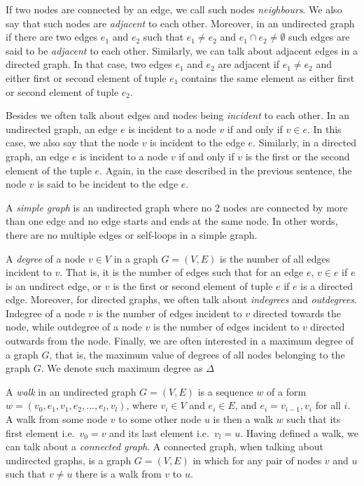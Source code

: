 If two nodes are connected by an edge, we call such nodes \emph{neighbours}. We
also say that such nodes are \emph{adjacent} to each other. Moreover, in an undirected graph
if there are two edges $e_1$ and $e_2$ such that $e_1 \neq e_2$ and $e_1 \cap e_2 \neq \emptyset$
such edges are said to be \emph{adjacent} to each other. Similarly, we can talk about adjacent 
edges in a directed graph. In that case, two edges $e_1$ and $e_2$ are adjacent if
$e_1 \neq e_2$ and either first or second element of tuple $e_1$ contains the same
element as either first or second element of tuple $e_2$.

Besides we often talk about edges and nodes being \emph{incident} to each other.
In an undirected graph, an edge $e$ is incident to a node $v$ if and only if $v \in e$. In this
case, we also say that the node $v$ is incident to the edge $e$. Similarly, in a
directed graph, an edge $e$ is incident to a node $v$ if and only if $v$ is the
first or the second element of the tuple $e$. Again, in the case described in the
previous sentence, the node $v$ is said to be incident to the edge $e$.

A \emph{simple graph} is an undirected graph where no 2 nodes are connected by more
than one edge and no edge starts and ends at the same node. In other words, there are
no multiple edges or self-loops in a simple graph.

A \emph{degree} of a node $v \in V$ in a graph $G = (V, E)$ is the number of all
edges incident to $v$. That is, it is the number of edges such that for an edge
$e$, $v \in e$ if $e$ is an undirect edge, or $v$ is the first or second element of
tuple $e$ if $e$ is a directed edge. Moreover, for directed graphs, we often talk
about \emph{indegrees} and \emph{outdegrees}. Indegree of a node $v$ is the number
of edges incident to $v$ directed towards the node, while outdegree of a node $v$ is the 
number of edges incident to $v$ directed outwards from the node. Finally, we are 
often interested in a maximum degree of a graph $G$, that is, the maximum value of
degrees of all nodes belonging to the graph $G$. We denote such maximum degree as
$\Delta$

A \emph{walk} in an undirected graph $G = (V, E)$ is a sequence $w$ of a form
$w = (v_0, e_1, v_1, e_2, ..., e_l, v_l)$,
where $v_i \in V$ and $e_i \in E$, and $e_i = {v_{i-1}, v_i}$ for all $i$. A walk from some
node $v$ to some other node $u$ is then a walk $w$ such that its first element i.e.\ $v_0 = v$
and its last element i.e.\ $v_l = u$. Having defined a walk, we can talk about a \emph{
connected graph}. A connected graph, when talking about undirected
graphs, is a graph $G = (V, E)$ in which for any pair of nodes $v$ and $u$ such that
$v \neq u$ there is a walk from $v$ to $u$.

